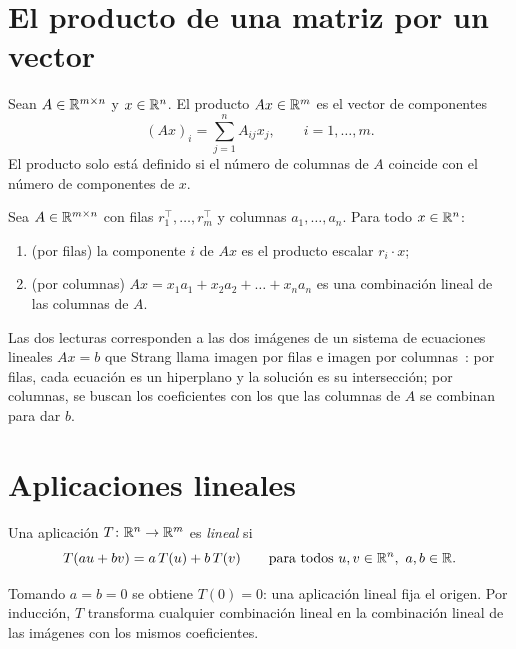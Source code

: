 \section{El producto de una matriz por un vector}

\begin{definicion}\label{def:matvec}
Sean $A\in\mathbb{R}^{m\times n}$ y $x\in\mathbb{R}^{n}$. El producto $Ax\in\mathbb{R}^{m}$ es el vector de componentes
\[
(Ax)_i=\sum_{j=1}^{n}A_{ij}x_j,\qquad i=1,\dots,m.
\]
El producto solo está definido si el número de columnas de $A$ coincide con el número de componentes de $x$.
\end{definicion}

\begin{proposicion}\label{prop:filas-columnas}
Sea $A\in\mathbb{R}^{m\times n}$ con filas $r_1^{\top},\dots,r_m^{\top}$ y columnas $a_1,\dots,a_n$. Para todo $x\in\mathbb{R}^{n}$:
\begin{enumerate}
  \item (por filas) la componente $i$ de $Ax$ es el producto escalar $r_i\cdot x$;
  \item (por columnas) $Ax=x_1a_1+x_2a_2+\dots+x_na_n$ es una combinación lineal de las columnas de $A$.
\end{enumerate}
\end{proposicion}

\addtocounter{definicion}{1}%

Las dos lecturas corresponden a las dos imágenes de un sistema de ecuaciones lineales $Ax=b$ que Strang llama imagen por filas e imagen por columnas~\cite[§2.1]{strang}: por filas, cada ecuación es un hiperplano y la solución es su intersección; por columnas, se buscan los coeficientes con los que las columnas de $A$ se combinan para dar $b$.

\section{Aplicaciones lineales}

\begin{definicion}\label{def:lineal}
Una aplicación $T\colon\mathbb{R}^{n}\to\mathbb{R}^{m}$ es \emph{lineal} si
\[
T(au+bv)=a\,T(u)+b\,T(v)\qquad\text{para todos } u,v\in\mathbb{R}^{n},\ a,b\in\mathbb{R}.
\]
\end{definicion}

Tomando $a=b=0$ se obtiene $T(0)=0$: una aplicación lineal fija el origen. Por inducción, $T$ transforma cualquier combinación lineal en la combinación lineal de las imágenes con los mismos coeficientes.

